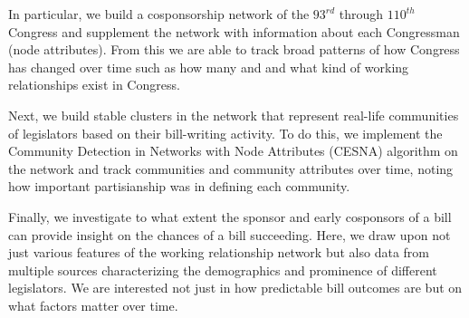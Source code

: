 In particular, we build a cosponsorship network of the $93^{rd}$ through
$110^{th}$ Congress and supplement the network with information about each
Congressman (node attributes). From this we are able to track broad patterns of
how Congress has changed over time such as how many and and what kind of working
relationships exist in Congress.

Next, we build stable clusters in the network that represent real-life
communities of legislators based on their bill-writing activity. To do this, we
implement the Community Detection in Networks with Node Attributes (CESNA)
algorithm on the network and track communities and community attributes over
time, noting how important partisianship was in defining each community.

Finally, we investigate to what extent the sponsor and early cosponsors of a
bill can provide insight on the chances of a bill succeeding. Here, we draw upon
not just various features of the working relationship network but also data from
multiple sources characterizing the demographics and prominence of different
legislators. We are interested not just in how predictable bill outcomes are but
on what factors matter over time.

